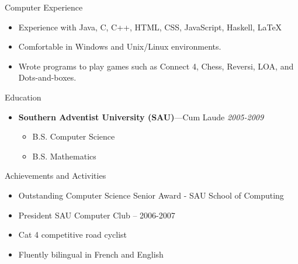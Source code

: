 \documentclass[11pt,oneside]{article}
\newenvironment{ressection}[1]{
	\vspace{4pt}
	{\fontfamily{phv}\selectfont\Large#1}
	\begin{itemize}
	\vspace{3pt}
}{
	\end{itemize}
}
\newcommand{\resitem}[1]{
	\vspace{-4pt}
	\item \begin{flushleft} #1 \end{flushleft}
}
\newcommand{\resbigitem}[3]{
	\vspace{-5pt}
	\item
	{\textbf{#1}---#2 \hfill \textit{#3}}
}
\newenvironment{restitledposition}[3]{
	\resbigitem{#1}{#2}{#3}
	\vspace{-2pt}
	\begin{itemize}
}{
	\end{itemize}
}
\begin{document}
\begin{ressection}{Computer Experience}
  \resitem{Experience with Java, C, C++, HTML, CSS, JavaScript, Haskell, \LaTeX}
  \resitem{Comfortable in Windows and Unix/Linux environments.}
  \resitem{Wrote programs to play games such as Connect 4, Chess, Reversi, LOA, and Dots-and-boxes.}
\end{ressection}

\begin{ressection}{Education}
	\begin{restitledposition}{Southern Adventist University (SAU)}{Cum Laude}{2005-2009}
		\resitem{B.S. Computer Science}
		\resitem{B.S. Mathematics}
	\end{restitledposition}
\end{ressection}


\begin{ressection}{Achievements and Activities}

	\resitem{Outstanding Computer Science Senior Award - SAU School of Computing}
	\resitem{President SAU Computer Club -- 2006-2007}
	\resitem{Cat 4 competitive road cyclist}
  \resitem{Fluently bilingual in French and English}

\end{ressection}
\end{document}
